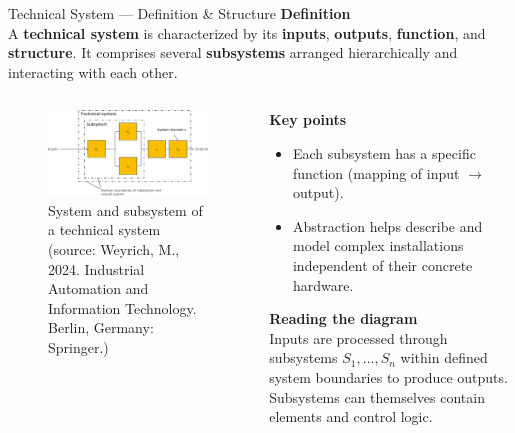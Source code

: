 \begin{frame}{Technical System — Definition \& Structure}
\textbf{Definition}\\
A \textbf{technical system} is characterized by its \textbf{inputs}, \textbf{outputs}, \textbf{function}, and \textbf{structure}. It comprises several \textbf{subsystems} arranged hierarchically and interacting with each other.

\vspace{-1.5mm}
\begin{columns}
	\begin{column}{0.55\textwidth}
		\begin{figure}
			\centering
			\includegraphics[width=\linewidth]{fig/lec01/tech_system.pdf}
			\caption*{System and subsystem of a technical system (source: Weyrich, M., 2024. Industrial Automation and Information Technology. Berlin, Germany: Springer.)}
		\end{figure}
	\end{column}
	\begin{column}{0.45\textwidth}
		\textbf{Key points}
		\begin{itemize}
		\item Each subsystem has a specific function (mapping of input $\rightarrow$ output).
		\item Abstraction helps describe and model complex installations independent of their concrete hardware.
		\end{itemize}
		\textbf{Reading the diagram}\\
		\footnotesize
		Inputs are processed through subsystems $S_1,\ldots,S_n$ within defined system boundaries to produce outputs. Subsystems can themselves contain elements and control logic.
	\end{column}
\end{columns}
\end{frame}


